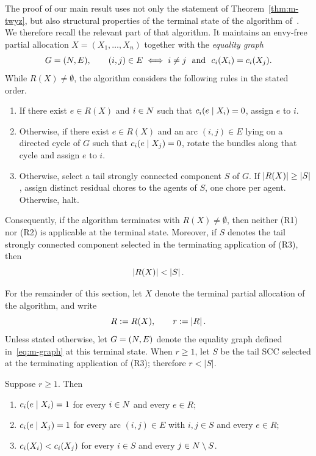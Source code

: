 The proof of our main result uses not only the statement of Theorem~\ref{thm:m-twyz}, but also structural properties of the terminal state of the algorithm of~\cite{tao2025existence}. We therefore recall the relevant part of that algorithm. It maintains an envy-free partial allocation $X=(X_1,\dots,X_n)$ together with the \emph{equality graph}
\begin{equation}
\label{eq:m-graph}
  G=(N,E),
  \qquad
  (i,j)\in E
  \iff
  i\ne j \ \text{ and }\ c_i(X_i)=c_i(X_j).
\end{equation}
While $R(X)\ne\emptyset$, the algorithm considers the following rules in the stated order.
\begin{enumerate}
  \item[(R1)] If there exist $e\in R(X)$ and $i\in N$ such that
        $c_i(e\mid X_i)=0$, assign $e$ to $i$.

  \item[(R2)] Otherwise, if there exist $e\in R(X)$ and an arc
        $(i,j)\in E$ lying on a directed cycle of $G$ such that
        $c_i(e\mid X_j)=0$, rotate the bundles along that cycle
        and assign $e$ to $i$.

 \item[(R3)] Otherwise, select a tail strongly connected component
$S$ of $G$. If $\left\lvert R(X)\right\rvert\geq\left\lvert S\right\rvert$, assign distinct residual
chores to the agents of $S$, one chore per agent. Otherwise, halt.
\end{enumerate}
Consequently, if the algorithm terminates with \(R(X)\neq\emptyset\), then neither (R1) nor (R2) is applicable at the terminal state. Moreover, if \(S\) denotes the tail strongly connected component selected in the terminating application of (R3), then
\[
    \left\lvert R(X)\right\rvert<\left\lvert S\right\rvert.
\]

For the remainder of this section, let $X$ denote the terminal partial allocation of the algorithm, and write
\[
    R:=R(X), \qquad r:=\left\lvert R\right\rvert.
\]
Unless stated otherwise, let $G=(N,E)$ denote the equality graph defined in~\eqref{eq:m-graph} at this terminal state. When \(r\ge1\), let \(S\) be the tail SCC selected at the terminating application of (R3); therefore \(r<|S|\).


\begin{lemma}
\label{lem:m-terminal}
Suppose $r \ge 1$. Then
\begin{enumerate}
  \item[(i)] $c_i(e \mid X_i) = 1$ for every $i \in N$ and every
        $e \in R$;
  \item[(ii)] $c_i(e \mid X_j) = 1$ for every arc $(i,j) \in E$ with
        $i,j \in S$ and every $e \in R$;
  \item[(iii)] $c_i(X_i) < c_i(X_j)$ for every $i \in S$ and every
        $j \in N \setminus S$.
\end{enumerate}
\end{lemma}

